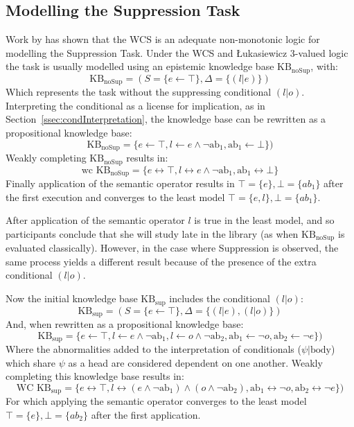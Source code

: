\subsection{Modelling the Suppression Task} \label{ssec:sup_mod}
Work by \cite{dietz2014modeling} has shown that the WCS is an adequate non-monotonic logic for modelling the Suppression Task. Under the WCS and \L ukasiewicz 3-valued logic the task is usually modelled using an epistemic knowledge base $\text{KB}_\text{noSup}$, with:
\[\text{KB}_\text{noSup}=(S=\{e \leftarrow \top\}, \Delta=\{(l|e)\})\]
Which represents the  task without the suppressing conditional $(l|o)$. Interpreting the conditional as a license for implication, as in Section~\ref{ssec:condInterpretation}, the knowledge base can be rewritten as a propositional knowledge base:
\[\text{KB}_\text{noSup}=\{e \leftarrow \top, l \leftarrow e \land \lnot \text{ab}_1, \text{ab}_1\leftarrow \bot\})\]
Weakly completing $\text{KB}_\text{noSup}$ results in:
\[\text{wc KB}_\text{noSup}=\{e \leftrightarrow \top, l \leftrightarrow e \land \lnot \text{ab}_1, \text{ab}_1\leftrightarrow \bot\}\]
Finally application of the semantic operator results in $\top=\{e\}, \bot=\{ab_1\}$ after the first execution and converges to the least model $\top=\{e,l\}, \bot=\{ab_1\}$.

After application of the semantic operator $l$ is true in the least model, and so participants conclude that she will study late in the library (as when $\text{KB}_\text{noSup}$ is evaluated classically). However, in the case where Suppression is observed, the same process yields a different result because of the presence of the extra conditional $(l|o)$.

Now the initial knowledge base $\text{KB}_\text{sup}$ includes the conditional $(l|o)$:
\[\text{KB}_\text{sup}=(S=\{e \leftarrow \top\}, \Delta=\{(l|e),(l|o)\})\]
And, when rewritten as a propositional knowledge base:
\[\text{KB}_\text{sup}=\{e \leftarrow \top, l \leftarrow e \land \lnot \text{ab}_1, l \leftarrow o \land \lnot \text{ab}_2, \text{ab}_1\leftarrow \lnot o, \text{ab}_2\leftarrow \lnot e\})\]
Where the abnormalities added to the interpretation of conditionals ($\psi|\text{body}$) which share $\psi$ as a head are considered dependent on one another. Weakly completing this knowledge base results in:
\[\text{WC KB}_\text{sup}=\{e \leftrightarrow \top, l \leftrightarrow (e \land \lnot \text{ab}_1) \land (o \land \lnot \text{ab}_2), \text{ab}_1\leftrightarrow \lnot o, \text{ab}_2\leftrightarrow \lnot e\})\]
For which applying the semantic operator converges to the least model $\top=\{e\},\bot=\{ab_2\}$ after the first application.

